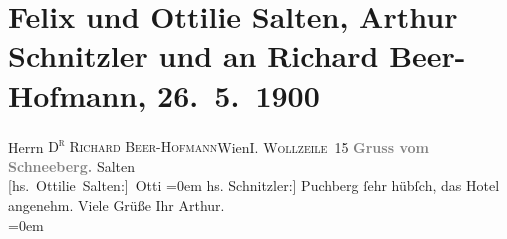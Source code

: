 

         
         \renewcommand{\erwaehntePersonen}{Personen: Richard Beer-Hofmann, Felix Salten, Ottilie Salten}
         \renewcommand{\erwaehnteOrte}{Orte: Puchberg am Schneeberg, Schneeberg, Wien, Wollzeile}
         \renewcommand{\erwaehnteWerke}{}
               \section[Felix und Ottilie Salten, Arthur Schnitzler und an Richard Beer-Hofmann, 26. 5. 1900]{ Felix und Ottilie Salten, Arthur Schnitzler und an Richard
               Beer-Hofmann, 26. 5. 1900}\nopagebreak{}\rehead{ }\begin{ledgroupsized}[t]{13cm}\normalsize\beginnumbering \toendnotes[C]{\smallbreak\pagebreak[2]} 
\pstart{}{\pb}Herrn \textsc{D\textsuperscript{r} Richard Beer-Hofmann}\pend{}\pstart{}Wien\pend{}\pstart{}\textsc{I. Wollzeile 15}\pend{}{\bigskip}\pstart
           \noindent{}\centering{}{\pb}\textcolor{gray}{\textbf{Gruss vom Schneeberg.}}\pend
           \pstart
           \spacefill\mbox{Salten}{\\[\baselineskip]}\spacefill\mbox{{[}hs. Ottilie Salten:{]} Otti}\pend
           \leftskip=0em{}\pstart
           \noindent{}{[}hs. Schnitzler:{]} Puchberg ſehr hübſch, das Hotel angenehm. Viele
               Grüße\pend
           \pstart
           Ihr \spacefill\mbox{Arthur.}{\\[\baselineskip]}\pend
           \leftskip=0em{}
         
         \endnumbering{}\end{ledgroupsized}  \newcommand{\dateiname}{L01041}\newcommand{\titel}{Felix und Ottilie Salten, Arthur Schnitzler und an Richard Beer-Hofmann, 26. 5. 1900}\newcommand{\editorInnen}{Martin Anton Müller und Gerd-Hermann Susen}
      